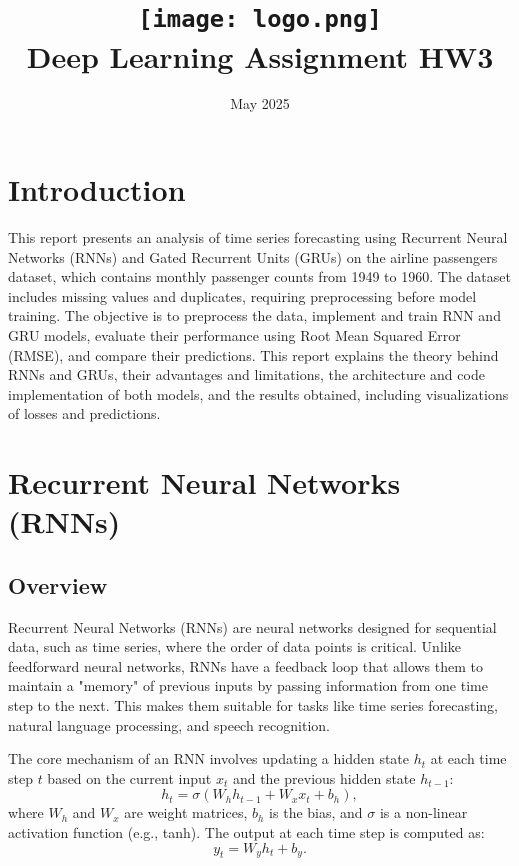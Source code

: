 \documentclass{article}
\title{
    \texttt{[image: logo.png]} \\
    Deep Learning Assignment HW3 \\ \exerciseset
}
\author{\FirstAuthor}
\date{May 2025}
\begin{document}
\maketitle

\section*{Introduction}
This report presents an analysis of time series forecasting using Recurrent Neural Networks (RNNs) and Gated Recurrent Units (GRUs) on the airline passengers dataset, which contains monthly passenger counts from 1949 to 1960. The dataset includes missing values and duplicates, requiring preprocessing before model training. The objective is to preprocess the data, implement and train RNN and GRU models, evaluate their performance using Root Mean Squared Error (RMSE), and compare their predictions. This report explains the theory behind RNNs and GRUs, their advantages and limitations, the architecture and code implementation of both models, and the results obtained, including visualizations of losses and predictions.

\section{Recurrent Neural Networks (RNNs)}
\subsection{Overview}
Recurrent Neural Networks (RNNs) are neural networks designed for sequential data, such as time series, where the order of data points is critical. Unlike feedforward neural networks, RNNs have a feedback loop that allows them to maintain a "memory" of previous inputs by passing information from one time step to the next. This makes them suitable for tasks like time series forecasting, natural language processing, and speech recognition.

The core mechanism of an RNN involves updating a hidden state \( h_t \) at each time step \( t \) based on the current input \( x_t \) and the previous hidden state \( h_{t-1} \):
\[
h_t = \sigma(W_h h_{t-1} + W_x x_t + b_h),
\]
where \( W_h \) and \( W_x \) are weight matrices, \( b_h \) is the bias, and \( \sigma \) is a non-linear activation function (e.g., tanh). The output at each time step is computed as:
\[
y_t = W_y h_t + b_y.
\]
\end{document}
